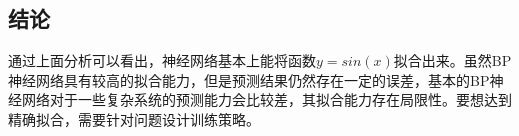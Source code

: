 \documentclass[twocolumn]{article}
\begin{document}
\begin{CJK}{UTF8}{gkai}
\section{结论}
通过上面分析可以看出，神经网络基本上能将函数$y=sin(x)$拟合出来。虽然BP神经网络具有较高的拟合能力，但是预测结果仍然存在一定的误差，基本的BP神经网络对于一些复杂系统的预测能力会比较差，其拟合能力存在局限性。要想达到精确拟合，需要针对问题设计训练策略。
{\small
	
	
}
\end{CJK}
\end{document}
